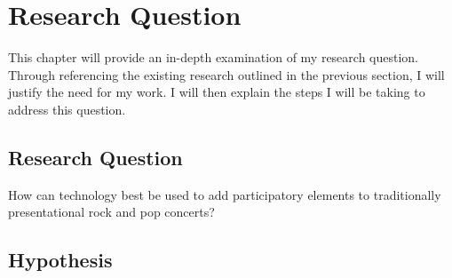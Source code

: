 \chapter{Research Question}

This chapter will provide an in-depth examination of my research question. Through referencing the existing research outlined in the previous section, I will justify the need for my work. I will then explain the steps I will be taking to address this question.

\section{Research Question}

How can technology best be used to add participatory elements to traditionally presentational rock and pop concerts?



\section{Hypothesis}



